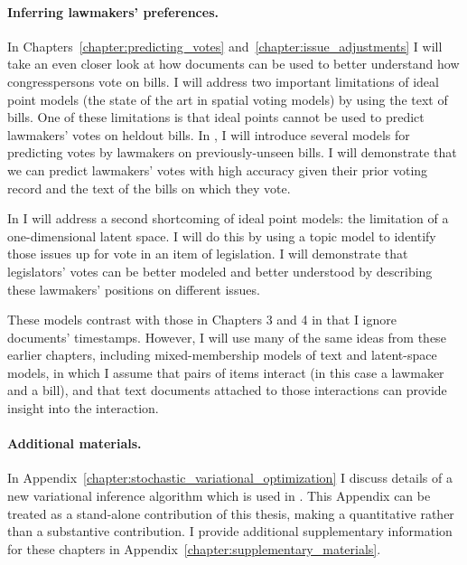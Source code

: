 
\paragraph{Inferring lawmakers' preferences.}

In Chapters~\ref{chapter:predicting_votes}
and~\ref{chapter:issue_adjustments} I will take an even closer look at
how documents can be used to better understand how congresspersons vote on
bills.  I will address two important limitations of ideal point models
(the state of the art in spatial voting models) by using the text of
bills.  One of these limitations is that ideal points cannot be used
to predict lawmakers' votes on heldout bills.  In
, I will introduce several models for
predicting votes by lawmakers on previously-unseen bills.  I will
demonstrate that we can predict lawmakers' votes with high accuracy
given their prior voting record and the text of the bills on which
they vote.

In  I will address a second shortcoming of
ideal point models: the limitation of a one-dimensional latent space.
I will do this by using a topic model to identify those issues up for
vote in an item of legislation.  I will demonstrate that legislators'
votes can be better modeled and better understood by describing these
lawmakers' positions on different issues.

These models contrast with those in Chapters 3 and 4 in that I ignore
documents' timestamps.  However, I will use many of the same ideas
from these earlier chapters, including mixed-membership models of text
and latent-space models, in which I assume that pairs of items
interact (in this case a lawmaker and a bill), and that text documents
attached to those interactions can provide insight into the
interaction.

\paragraph{Additional materials.}
In Appendix~\ref{chapter:stochastic_variational_optimization} I
discuss details of a new variational inference algorithm which is used
in .  This Appendix can be treated as a
stand-alone contribution of this thesis, making a quantitative rather
than a substantive contribution.  I provide additional supplementary
information for these chapters in
Appendix~\ref{chapter:supplementary_materials}.

